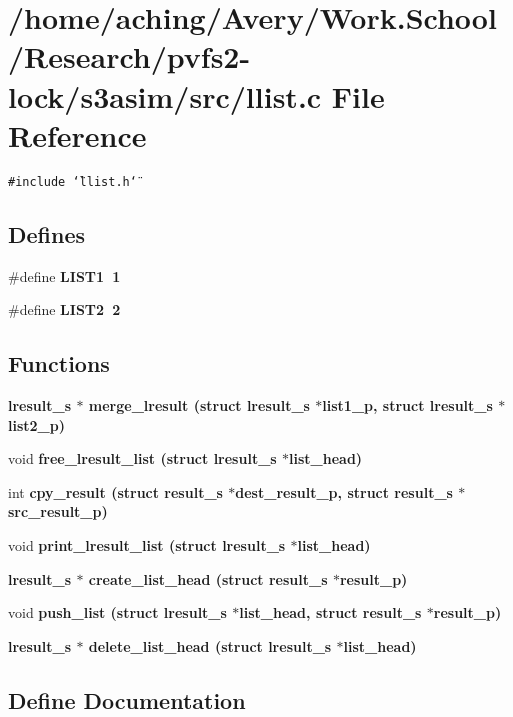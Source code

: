 \section{/home/aching/Avery/Work.School/Research/pvfs2-lock/s3asim/src/llist.c File Reference}
\label{llist_8c}
{\tt \#include \char`\"{}llist.h\char`\"{}}\par
\subsection*{Defines}
\begin{CompactItemize}
\item 
\#define \bf{LIST1}~1
\item 
\#define \bf{LIST2}~2
\end{CompactItemize}
\subsection*{Functions}
\begin{CompactItemize}
\item 
\bf{lresult\_\-s} $\ast$ \bf{merge\_\-lresult} (struct \bf{lresult\_\-s} $\ast$list1\_\-p, struct \bf{lresult\_\-s} $\ast$list2\_\-p)
\item 
void \bf{free\_\-lresult\_\-list} (struct \bf{lresult\_\-s} $\ast$list\_\-head)
\item 
int \bf{cpy\_\-result} (struct \bf{result\_\-s} $\ast$dest\_\-result\_\-p, struct \bf{result\_\-s} $\ast$src\_\-result\_\-p)
\item 
void \bf{print\_\-lresult\_\-list} (struct \bf{lresult\_\-s} $\ast$list\_\-head)
\item 
\bf{lresult\_\-s} $\ast$ \bf{create\_\-list\_\-head} (struct \bf{result\_\-s} $\ast$result\_\-p)
\item 
void \bf{push\_\-list} (struct \bf{lresult\_\-s} $\ast$list\_\-head, struct \bf{result\_\-s} $\ast$result\_\-p)
\item 
\bf{lresult\_\-s} $\ast$ \bf{delete\_\-list\_\-head} (struct \bf{lresult\_\-s} $\ast$list\_\-head)
\end{CompactItemize}


\subsection{Define Documentation}

